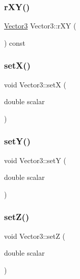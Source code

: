 \mbox{\label{class_vector3_aaf2a01831ab227b33593145fc21f74d6}} 
\subsubsection{\texorpdfstring{rXY()}{rXY()}}
{\footnotesize\ttfamily \mbox{\hyperlink{class_vector3}{Vector3}} Vector3\+::r\+XY (\begin{DoxyParamCaption}{ }\end{DoxyParamCaption}) const\hspace{0.3cm}{\ttfamily [inline]}}

\mbox{\label{class_vector3_add0f1fd39742bfcc74a0d9fe620e0178}} 
\subsubsection{\texorpdfstring{setX()}{setX()}}
{\footnotesize\ttfamily void Vector3\+::setX (\begin{DoxyParamCaption}\item[{double}]{scalar }\end{DoxyParamCaption})\hspace{0.3cm}{\ttfamily [inline]}}

\mbox{\label{class_vector3_a3197fa0880adc862a01f9bf29dd83e10}} 
\subsubsection{\texorpdfstring{setY()}{setY()}}
{\footnotesize\ttfamily void Vector3\+::setY (\begin{DoxyParamCaption}\item[{double}]{scalar }\end{DoxyParamCaption})\hspace{0.3cm}{\ttfamily [inline]}}

\mbox{\label{class_vector3_a4404619e2da9f0717c2d1b68fa4830f2}} 
\subsubsection{\texorpdfstring{setZ()}{setZ()}}
{\footnotesize\ttfamily void Vector3\+::setZ (\begin{DoxyParamCaption}\item[{double}]{scalar }\end{DoxyParamCaption})\hspace{0.3cm}{\ttfamily [inline]}}

